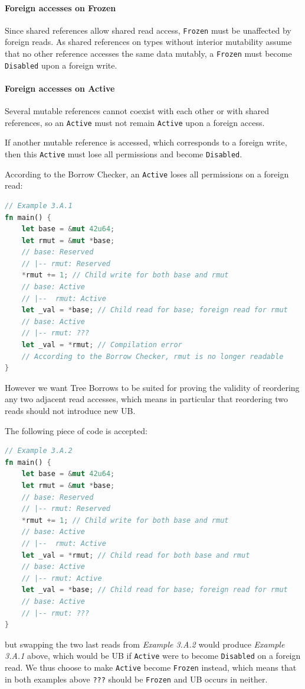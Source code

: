 \documentclass[a4paper,11pt]{article}
\theoremstyle{plain}
\theoremstyle{definition}
\theoremstyle{remark}
\newcommand{\tperm}[1]{\texttt{#1}}
\begin{document}
\paragraph*{Foreign accesses on Frozen}

Since shared references allow shared read access, \tperm{Frozen} must be unaffected
by foreign reads. As shared references on types without interior mutability
assume that no other reference accesses the same data mutably, a \tperm{Frozen} must
become \tperm{Disabled} upon a foreign write.

\paragraph*{Foreign accesses on Active}

Several mutable references cannot coexist with each other or with shared
references, so an \tperm{Active} must not remain \tperm{Active} upon a foreign access.

If another mutable reference is accessed, which corresponds to a foreign write,
then this \tperm{Active} must lose all permissions and become \tperm{Disabled}.

According to the Borrow Checker, an \tperm{Active} loses all permissions on a foreign read:
\begin{lstlisting}[language=rust]
// Example 3.A.1
fn main() {
    let base = &mut 42u64;
    let rmut = &mut *base;
    // base: Reserved
    // |-- rmut: Reserved
    *rmut += 1; // Child write for both base and rmut
    // base: Active
    // |--  rmut: Active
    let _val = *base; // Child read for base; foreign read for rmut
    // base: Active
    // |-- rmut: ???
    let _val = *rmut; // Compilation error
    // According to the Borrow Checker, rmut is no longer readable
}
\end{lstlisting}

However we want Tree Borrows to be suited for proving the validity of reordering
any two adjacent read accesses, which means in particular that reordering two
reads should not introduce new UB.

The following piece of code is accepted:
\begin{lstlisting}[language=rust]
// Example 3.A.2
fn main() {
    let base = &mut 42u64;
    let rmut = &mut *base;
    // base: Reserved
    // |-- rmut: Reserved
    *rmut += 1; // Child write for both base and rmut
    // base: Active
    // |--  rmut: Active
    let _val = *rmut; // Child read for both base and rmut
    // base: Active
    // |-- rmut: Active
    let _val = *base; // Child read for base; foreign read for rmut
    // base: Active
    // |-- rmut: ???
}
\end{lstlisting}
but swapping the two last reads from \textit{Example 3.A.2} would produce \textit{Example 3.A.1} above,
which would be UB if \tperm{Active} were to become \tperm{Disabled} on a foreign read.
We thus choose to make \tperm{Active} become \tperm{Frozen} instead, which means that in
both examples above \tperm{???} should be \tperm{Frozen} and UB occurs in neither.
\end{document}
